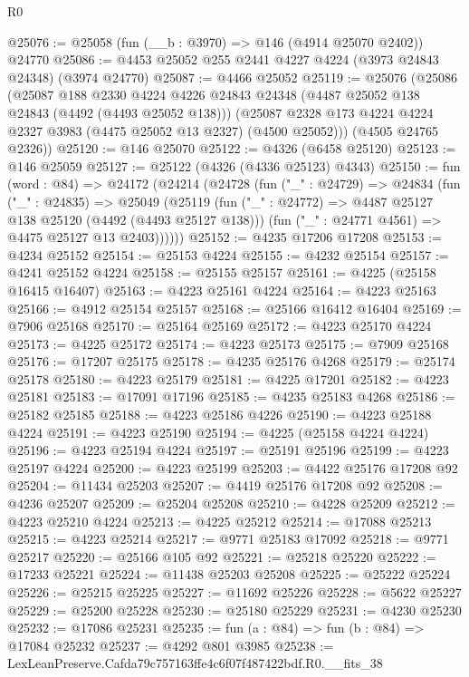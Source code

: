 \begin{lexlean}{R0}
\begin{coremodule}
@25076 := @25058 (fun (__b : @3970) => @146 (@4914 @25070 @2402)) @24770
@25086 := @4453 @25052 @255 @2441 @4227 @4224 (@3973 @24843 @24348) (@3974 @24770)
@25087 := @4466 @25052
@25119 := @25076
    (@25086
      (@25087
        @188
        @2330
        @4224
        @4226
        @24843
        @24348
        (@4487 @25052 @138 @24843 (@4492 (@4493 @25052 @138)))
        (@25087 @2328 @173 @4224 @4224 @2327 @3983 (@4475 @25052 @13 @2327) (@4500 @25052)))
      (@4505 @24765 @2326))
@25120 := @146 @25070
@25122 := @4326 (@6458 @25120)
@25123 := @146 @25059
@25127 := @25122 (@4326 (@4336 @25123) @4343)
@25150 := fun (word : @84) =>
  @24172
    (@24214
      (@24728
        (fun ("_" : @24729) =>
        @24834
          (fun ("_" : @24835) =>
          @25049
            (@25119
              (fun ("_" : @24772) => @4487 @25127 @138 @25120 (@4492 (@4493 @25127 @138)))
              (fun ("_" : @24771 @4561) => @4475 @25127 @13 @2403))))))
@25152 := @4235 @17206 @17208
@25153 := @4234 @25152
@25154 := @25153 @4224
@25155 := @4232 @25154
@25157 := @4241 @25152 @4224
@25158 := @25155 @25157
@25161 := @4225 (@25158 @16415 @16407)
@25163 := @4223 @25161 @4224
@25164 := @4223 @25163
@25166 := @4912 @25154 @25157
@25168 := @25166 @16412 @16404
@25169 := @7906 @25168
@25170 := @25164 @25169
@25172 := @4223 @25170 @4224
@25173 := @4225 @25172
@25174 := @4223 @25173
@25175 := @7909 @25168
@25176 := @17207 @25175
@25178 := @4235 @25176 @4268
@25179 := @25174 @25178
@25180 := @4223 @25179
@25181 := @4225 @17201
@25182 := @4223 @25181
@25183 := @17091 @17196
@25185 := @4235 @25183 @4268
@25186 := @25182 @25185
@25188 := @4223 @25186 @4226
@25190 := @4223 @25188 @4224
@25191 := @4223 @25190
@25194 := @4225 (@25158 @4224 @4224)
@25196 := @4223 @25194 @4224
@25197 := @25191 @25196
@25199 := @4223 @25197 @4224
@25200 := @4223 @25199
@25203 := @4422 @25176 @17208 @92
@25204 := @11434 @25203
@25207 := @4419 @25176 @17208 @92
@25208 := @4236 @25207
@25209 := @25204 @25208
@25210 := @4228 @25209
@25212 := @4223 @25210 @4224
@25213 := @4225 @25212
@25214 := @17088 @25213
@25215 := @4223 @25214
@25217 := @9771 @25183 @17092
@25218 := @9771 @25217
@25220 := @25166 @105 @92
@25221 := @25218 @25220
@25222 := @17233 @25221
@25224 := @11438 @25203 @25208
@25225 := @25222 @25224
@25226 := @25215 @25225
@25227 := @11692 @25226
@25228 := @5622 @25227
@25229 := @25200 @25228
@25230 := @25180 @25229
@25231 := @4230 @25230
@25232 := @17086 @25231
@25235 := fun (a : @84) => fun (b : @84) => @17084 @25232
@25237 := @4292 @801 @3985
@25238 := LexLeanPreserve.Cafda79c757163ffe4c6f07f487422bdf.R0.__fits_38

\end{coremodule}
\end{lexlean}
